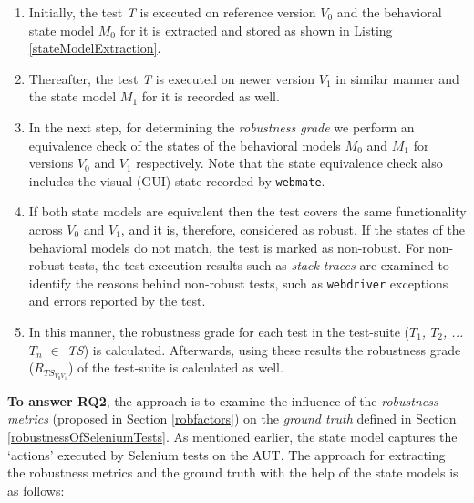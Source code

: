 \begin{enumerate}
\item Initially, the test \textit{T} is executed on reference version \textit{$V_{0}$} and the behavioral state model \textit{$M_{0}$} for it is extracted and stored as shown in Listing \ref{stateModelExtraction}. 
\item Thereafter, the test \textit{T} is executed on newer version \textit{$V_{1}$} in similar manner and the state model \textit{$M_{1}$} for it is recorded as well.

\item In the next step, for determining the \textit{robustness grade} we perform an equivalence check of the states of the behavioral models \textit{$M_{0}$} and \textit{$M_{1}$} for versions \textit{$V_{0}$} and \textit{$V_{1}$} respectively.  
Note that the state equivalence check also includes the visual (GUI) state recorded by \texttt{webmate}.

\item If both state models are equivalent then the test covers the same functionality across  \textit{$V_{0}$} and \textit{$V_{1}$}, and it is, therefore, considered as robust. If the states of the behavioral models do not match, the test is marked as non-robust. For non-robust tests, the test execution results such as \textit{stack-traces} are examined to identify the reasons behind non-robust tests, such as \texttt{webdriver} exceptions \cite{SeleniumExceptions} and errors reported by the test. 

\item In this manner, the robustness grade for each test in the test-suite (\textit{$T_1$, $T_2$, ...$T_n$ $\in$ TS}) is calculated. Afterwards, using these results the robustness grade ($R_{TS_{V_{0}V_{1}}}$) of the test-suite is calculated as well.

\end{enumerate}

\textbf{To answer RQ2}, the approach is to examine the influence of the \textit{robustness metrics} (proposed in Section \ref{robfactors}) on the \textit{ground truth} defined in Section \ref{robustnessOfSeleniumTests}. As mentioned earlier, the state model captures the `actions' executed by Selenium tests on the AUT. The approach for extracting the robustness metrics and the ground truth with the help of the state models is as follows: 

